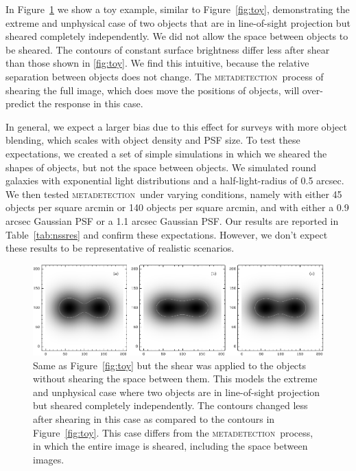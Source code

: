\documentclass[draft, iop, twocolappendix, appendixfloats, numberedappendix, apj]{hackemulateapj}
\newcommand{\mdet}{\textsc{metadetection}}
\begin{document}
In Figure~\ref{fig:toynoscene} we show a toy example, similar to
Figure~\ref{fig:toy}, demonstrating the extreme and unphysical case of two
objects that are in line-of-sight projection but sheared completely
independently.  We did not allow the space between objects to be sheared. The
contours of constant surface brightness differ less after shear than those
shown in \ref{fig:toy}.  We find this intuitive, because the relative separation
between objects does not change.  The \mdet\ process of shearing the full
image, which does move the positions of objects, will over-predict the response
in this case.

In general, we expect a larger bias due to this effect for surveys with more
object blending, which scales with object density and PSF size.  To test these
expectations, we created a set of simple simulations in which we sheared the
shapes of objects, but not the space between objects.  We simulated round
galaxies with exponential light distributions and a half-light-radius of 0.5
arcsec. We then tested \mdet\ under varying conditions, namely with either 45
objects per square arcmin or 140 objects per square arcmin, and with either a
0.9 arcsec Gaussian PSF or a 1.1 arcsec Gaussian PSF. Our results are reported
in Table~\ref{tab:nssres} and confirm these expectations. However, we don't
expect these results to be representative of realistic scenarios.


\begin{figure}
    \begin{center}
        \includegraphics[width=\textwidth]{toy-no-full-scene.pdf}

        \caption{Same as Figure~\ref{fig:toy} but the shear was applied to the
        objects without shearing the space between them. This models the extreme
        and unphysical case where two objects are in line-of-sight projection but
        sheared completely independently.  The contours changed less after shearing
        in this case as compared to the contours in Figure~\ref{fig:toy}.  This
        case differs from the \mdet\ process, in which the entire image is sheared,
        including the space between images.  \label{fig:toynoscene} }
    \end{center}

\end{figure}
\end{document}
